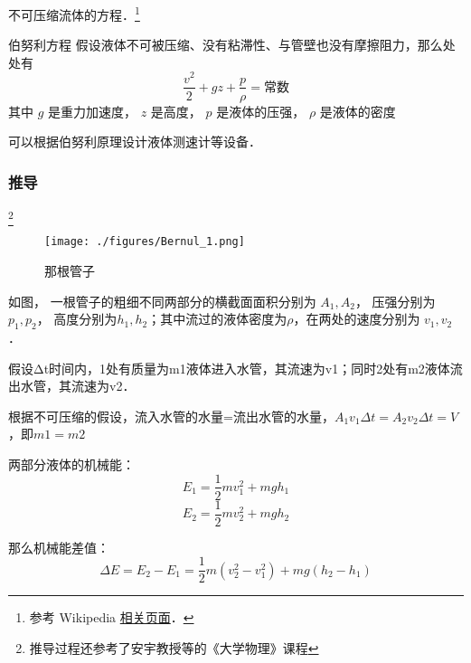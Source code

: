 
\begin{issues}
\issueDraft
\end{issues}

不可压缩流体的方程．\footnote{参考 Wikipedia \href{https://en.wikipedia.org/wiki/Bernoulli-principle}{相关页面}．}

\begin{theorem}{伯努利方程}
假设液体不可被压缩、没有粘滞性、与管壁也没有摩擦阻力，那么处处有
\begin{equation}
\frac{v^2}{2} + gz + \frac{p}{\rho} = \text{常数}
\end{equation}
其中 $g$ 是重力加速度， $z$ 是高度， $p$ 是液体的压强， $\rho$ 是液体的密度
\end{theorem}
可以根据伯努利原理设计液体测速计等设备．

\subsubsection{推导}
\footnote{推导过程还参考了安宇教授等的《大学物理》课程}
\begin{figure}[ht]
\centering
\texttt{[image: ./figures/Bernul\_1.png]}
\caption{那根管子} \label{Bernul_fig1}
\end{figure}
如图， 一根管子的粗细不同两部分的横截面面积分别为 $A_1, A_2$， 压强分别为 $p_1, p_2$， 高度分别为$h_1, h_2$；其中流过的液体密度为$\rho$，在两处的速度分别为 $v_1, v_2$．

假设Δt时间内，1处有质量为m1液体进入水管，其流速为v1；同时2处有m2液体流出水管，其流速为v2．

根据不可压缩的假设，流入水管的水量=流出水管的水量，$A_1v_1\Delta t=A_2v_2\Delta t=V$，即$m1=m2$

两部分液体的机械能：
\begin{equation}
E_1=\frac{1}{2}mv_1^2+mgh_1
\end{equation}
\begin{equation}
E_2=\frac{1}{2}mv_2^2+mgh_2
\end{equation}

那么机械能差值：
\begin{equation}
\Delta E = E_2 - E_1 = \frac{1}{2}m(v_2^2-v_1^2)+mg(h_2-h_1)
\end{equation}

